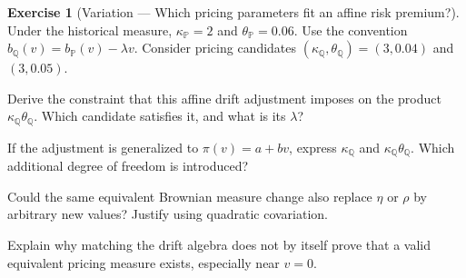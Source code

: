\documentclass[11pt]{article}
\newcommand{\Qbb}{\mathbb Q}
\newcommand{\Pb}{\mathbb P}\newcommand{\F}{\mathcal F}\newcommand{\Var}{\operatorname{Var}}
\theoremstyle{definition}
\newtheorem{exercise}{Exercise}[section]
\begin{document}
\begin{exercise}[Variation --- Which pricing parameters fit an affine risk premium?]
Under the historical measure, \(\kappa_{\Pb}=2\) and
\(\theta_{\Pb}=0.06\). Use the convention
\(b_{\Qbb}(v)=b_{\Pb}(v)-\lambda v\).
Consider pricing candidates \((\kappa_{\Qbb},\theta_{\Qbb})=(3,0.04)\)
and \((3,0.05)\).
\begin{exparts}
\item Derive the constraint that this affine drift adjustment imposes on the product \(\kappa_{\Qbb}\theta_{\Qbb}\). Which candidate satisfies it, and what is its \(\lambda\)?
\item If the adjustment is generalized to \(\pi(v)=a+bv\), express \(\kappa_{\Qbb}\) and \(\kappa_{\Qbb}\theta_{\Qbb}\). Which additional degree of freedom is introduced?
\item Could the same equivalent Brownian measure change also replace \(\eta\) or \(\rho\) by arbitrary new values? Justify using quadratic covariation.
\item Explain why matching the drift algebra does not by itself prove that a valid equivalent pricing measure exists, especially near \(v=0\).
\end{exparts}
\end{exercise}
\fi

\ifdefined\ExercisesSynthesis\else
\end{document}
